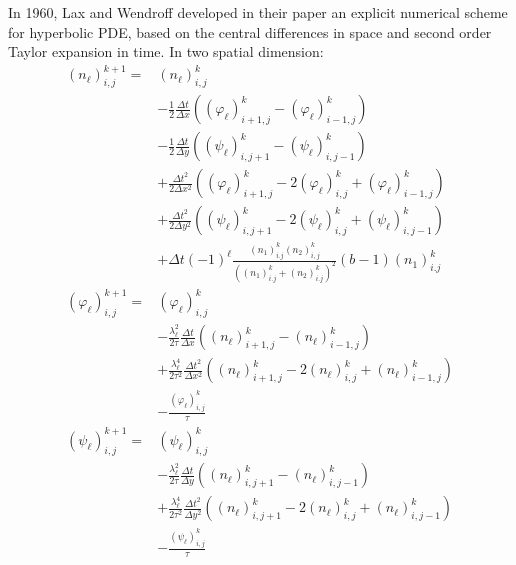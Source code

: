 In 1960, Lax and Wendroff developed in their paper \cite{lax_systems_1960}
an explicit numerical scheme for hyperbolic PDE, based on the central
differences in space and second order Taylor expansion in time. In
two spatial dimension:
\begin{align*}
\left(n_{\ell}\right)_{i,j}^{k+1}= & \left(n_{\ell}\right)_{i,j}^{k}\\
 & -\frac{1}{2}\frac{\Delta t}{\Delta x}\left(\left(\varphi_{\ell}\right)_{i+1,j}^{k}-\left(\varphi_{\ell}\right)_{i-1,j}^{k}\right)\\
 & -\frac{1}{2}\frac{\Delta t}{\Delta y}\left(\left(\psi_{\ell}\right)_{i,j+1}^{k}-\left(\psi_{\ell}\right)_{i,j-1}^{k}\right)\\
 & +\frac{\Delta t^{2}}{2\Delta x^{2}}\left(\left(\varphi_{\ell}\right)_{i+1,j}^{k}-2\left(\varphi_{\ell}\right)_{i,j}^{k}+\left(\varphi_{\ell}\right)_{i-1,j}^{k}\right)\\
 & +\frac{\Delta t^{2}}{2\Delta y^{2}}\left(\left(\psi_{\ell}\right)_{i,j+1}^{k}-2\left(\psi_{\ell}\right)_{i,j}^{k}+\left(\psi_{\ell}\right)_{i,j-1}^{k}\right)\\
 & +\Delta t\left(-1\right)^{\ell}\frac{\left(n_{1}\right)_{i.j}^{k}\left(n_{2}\right)_{i,j}^{k}}{\left(\left(n_{1}\right)_{i.j}^{k}+\left(n_{2}\right)_{i.j}^{k}\right)^{2}}\left(b-1\right)\left(n_{1}\right)_{i.j}^{k}\\
\left(\varphi_{\ell}\right)_{i,j}^{k+1}= & \left(\varphi_{\ell}\right)_{i,j}^{k}\\
 & -\frac{\lambda_{\ell}^{2}}{2\tau}\frac{\Delta t}{\Delta x}\left(\left(n_{\ell}\right)_{i+1,j}^{k}-\left(n_{\ell}\right)_{i-1,j}^{k}\right)\\
 & +\frac{\lambda_{\ell}^{4}}{2\tau^{2}}\frac{\Delta t^{2}}{\Delta x^{2}}\left(\left(n_{\ell}\right)_{i+1,j}^{k}-2\left(n_{\ell}\right)_{i,j}^{k}+\left(n_{\ell}\right)_{i-1,j}^{k}\right)\\
 & -\frac{\left(\varphi_{\ell}\right)_{i,j}^{k}}{\tau}\\
\left(\psi_{\ell}\right)_{i,j}^{k+1}= & \left(\psi_{\ell}\right)_{i,j}^{k}\\
 & -\frac{\lambda_{\ell}^{2}}{2\tau}\frac{\Delta t}{\Delta y}\left(\left(n_{\ell}\right)_{i,j+1}^{k}-\left(n_{\ell}\right)_{i,j-1}^{k}\right)\\
 & +\frac{\lambda_{\ell}^{4}}{2\tau^{2}}\frac{\Delta t^{2}}{\Delta y^{2}}\left(\left(n_{\ell}\right)_{i,j+1}^{k}-2\left(n_{\ell}\right)_{i,j}^{k}+\left(n_{\ell}\right)_{i,j-1}^{k}\right)\\
 & -\frac{\left(\psi_{\ell}\right)_{i,j}^{k}}{\tau}
\end{align*}


